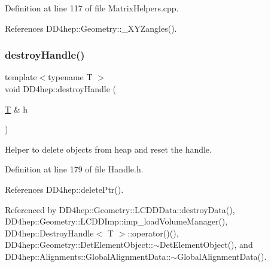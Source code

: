 Definition at line 117 of file Matrix\+Helpers.\+cpp.



References D\+D4hep\+::\+Geometry\+::\+\_\+\+X\+Y\+Zangles().

\hypertarget{group___d_d4_h_e_p___g_e_o_m_e_t_r_y_gafdf7bdfc33b97172b15a9a953b460046}{}\label{group___d_d4_h_e_p___g_e_o_m_e_t_r_y_gafdf7bdfc33b97172b15a9a953b460046} 
\subsubsection{\texorpdfstring{destroy\+Handle()}{destroyHandle()}}
{\footnotesize\ttfamily template$<$typename T $>$ \\
void D\+D4hep\+::destroy\+Handle (\begin{DoxyParamCaption}\item[{\hyperlink{class_t}{T} \&}]{h }\end{DoxyParamCaption})\hspace{0.3cm}{\ttfamily [inline]}}



Helper to delete objects from heap and reset the handle. 



Definition at line 179 of file Handle.\+h.



References D\+D4hep\+::delete\+Ptr().



Referenced by D\+D4hep\+::\+Geometry\+::\+L\+C\+D\+D\+Data\+::destroy\+Data(), D\+D4hep\+::\+Geometry\+::\+L\+C\+D\+D\+Imp\+::imp\+\_\+load\+Volume\+Manager(), D\+D4hep\+::\+Destroy\+Handle$<$ T $>$\+::operator()(), D\+D4hep\+::\+Geometry\+::\+Det\+Element\+Object\+::$\sim$\+Det\+Element\+Object(), and D\+D4hep\+::\+Alignments\+::\+Global\+Alignment\+Data\+::$\sim$\+Global\+Alignment\+Data().

\hypertarget{group___d_d4_h_e_p___g_e_o_m_e_t_r_y_gacb7266110e19d4dda6cc6b2ebc57bd39}{}\label{group___d_d4_h_e_p___g_e_o_m_e_t_r_y_gacb7266110e19d4dda6cc6b2ebc57bd39} 
